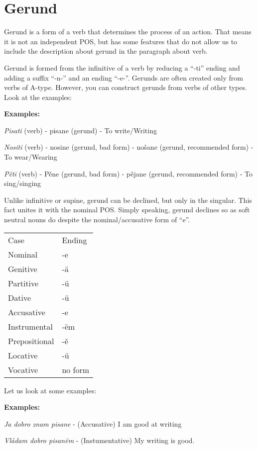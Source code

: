 \section{Gerund}

Gerund is a form of a verb that determines the process of an action. That means it is not an independent POS, but has some features that do not allow us to include the description about gerund in the paragraph about verb.

Gerund is formed from the infinitive of a verb by reducing a “-ti” ending and adding a suffix “-n-” and an ending “-e-”. Gerunds are often created only from verbs of A-type. However, you can construct gerunds from verbs of other types. Look at the examples:

\textbf{Examples:}

\textit{Pisati} (verb) - pisane (gerund) - To write/Writing

\textit{Nositi} (verb) - nosine (gerund, bad form) - nošane (gerund, recommended form) - To wear/Wearing

\textit{Pěti} (verb) - Pěne (gerund, bad form) - pějane (gerund, recommended form) - To sing/singing

Unlike infinitive or supine, gerund can be declined, but only in the singular. This fact unites it with the nominal POS. Simply speaking, gerund declines so as soft neutral nouns do despite the nominal/accusative form of “e”.

\begin{table}
	\begin{tabular}{ll}
	Case & Ending \\
	Nominal & -e \\
	Genitive & -ä \\
	Partitive & -ü \\
	Dative & -ü \\
	Accusative & -e \\
	Instrumental & -ëm \\
	Prepositional & -ě \\
	Locative & -ü \\
	Vocative & no form
	\end{tabular}
\end{table}

Let us look at some examples:

\textbf{Examples:}

\textit{Ja dobro znam pisane} - (Accusative) I am good at writing

\textit{Vlådam dobro pisanëm} - (Instumentative) My writing is good.


